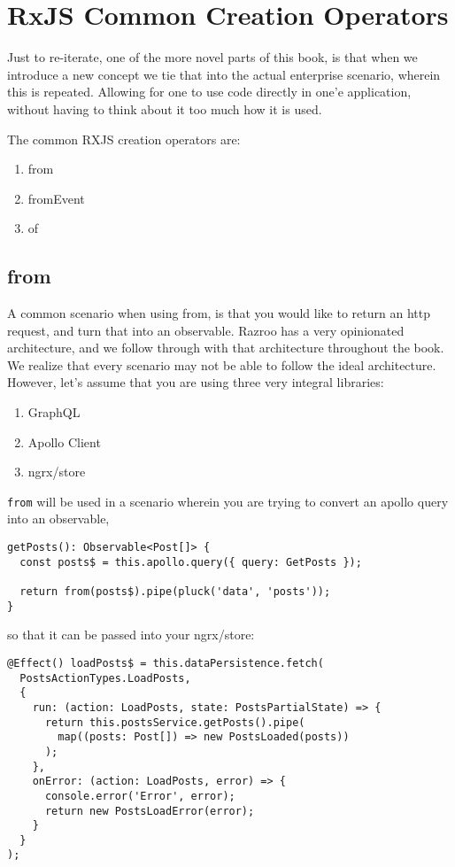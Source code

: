 \chapter{RxJS Common Creation Operators}
Just to re-iterate, one of the more novel parts of this book, is that when we 
introduce a new concept we tie that into the actual enterprise scenario, 
wherein this is repeated. Allowing for one to use code directly in one'e 
application, without having to think about it too much how it is used. 

The common RXJS creation operators are: 
\begin{enumerate}
  \item from
  \item fromEvent
  \item of
\end{enumerate}

\section{from}
A common scenario when using from, is that you would like to return an http 
request, and turn that into an observable. Razroo has a very opinionated 
architecture, and we follow through with that architecture throughout the 
book. We realize that every scenario may not be able to follow the ideal
architecture. However, let's assume that you are using three very integral
libraries: 
\begin{enumerate}
  \item GraphQL 
  \item Apollo Client
  \item ngrx/store
\end{enumerate}

\lstinline{from} will be used in a scenario wherein you are trying to convert 
an apollo query into an observable, 

\begin{lstlisting}[caption=posts.service.ts]
getPosts(): Observable<Post[]> {
  const posts$ = this.apollo.query({ query: GetPosts });

  return from(posts$).pipe(pluck('data', 'posts'));
}
\end{lstlisting}

so that it can be passed into your ngrx/store:

\begin{lstlisting}[caption=posts.effects.ts]
@Effect() loadPosts$ = this.dataPersistence.fetch(
  PostsActionTypes.LoadPosts,
  {
    run: (action: LoadPosts, state: PostsPartialState) => {
      return this.postsService.getPosts().pipe(
        map((posts: Post[]) => new PostsLoaded(posts))
      );
    },
    onError: (action: LoadPosts, error) => {
      console.error('Error', error);
      return new PostsLoadError(error);
    }
  }
);
\end{lstlisting}

